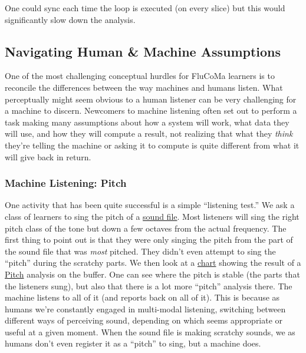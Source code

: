 \documentclass{article}
\begin{document}
One could sync each time the loop is executed (on every slice) but this
would significantly slow down the analysis.

\subsection{Navigating Human \& Machine Assumptions}\label{navigating-human-machine-assumptions}

One of the most challenging conceptual hurdles for FluCoMa learners is
to reconcile the differences between the way machines and humans listen.
What perceptually might seem obvious to a human listener can be very
challenging for a machine to discern. Newcomers to machine listening
often set out to perform a task making many assumptions about how a
system will work, what data they will use, and how they will compute a
result, not realizing that what they \emph{think} they're telling the
machine or asking it to compute is quite different from what it will
give back in return.

\subsubsection{Machine Listening: Pitch}

One activity that has been quite successful is a simple ``listening
test.'' We ask a class of learners to sing the pitch of a
\href{https://learn.flucoma.org/learn/weighting-stats/01_src.mp3}{sound file}. Most listeners will sing the right pitch class of the tone
but down a few octaves from the actual frequency. The first thing to
point out is that they were only singing the pitch from the part of the
sound file that was \emph{most} pitched. They didn't even attempt to
sing the ``pitch'' during the scratchy parts. We then look at a 
\href{https://learn.flucoma.org/learn/weighting-stats/03_src_with_pitch.jpg}{chart}
showing the result of a
\href{https://learn.flucoma.org/reference/pitch/}{Pitch} analysis on the
buffer. One can see where the pitch is stable (the parts that the
listeners sung), but also that there is a lot more ``pitch'' analysis
there. The machine listens to all of it (and reports back on all of it).
This is because as humans we're constantly engaged in multi-modal
listening, switching between different ways of perceiving sound,
depending on which seems appropriate or useful at a given moment. When
the sound file is making scratchy sounds, we as humans don't even
register it as a ``pitch'' to sing, but a machine does.
\end{document}
